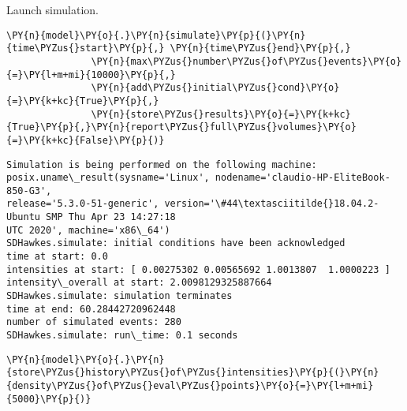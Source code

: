 \documentclass[10pt, article,table]{article}
\begin{document}
Launch simulation.
\begin{tcolorbox}[breakable, size=fbox, boxrule=1pt, pad at break*=1mm,colback=cellbackground, colframe=cellborder]
\begin{Verbatim}[commandchars=\\\{\}]
\PY{n}{model}\PY{o}{.}\PY{n}{simulate}\PY{p}{(}\PY{n}{time\PYZus{}start}\PY{p}{,} \PY{n}{time\PYZus{}end}\PY{p}{,}
               \PY{n}{max\PYZus{}number\PYZus{}of\PYZus{}events}\PY{o}{=}\PY{l+m+mi}{10000}\PY{p}{,}
               \PY{n}{add\PYZus{}initial\PYZus{}cond}\PY{o}{=}\PY{k+kc}{True}\PY{p}{,}
               \PY{n}{store\PYZus{}results}\PY{o}{=}\PY{k+kc}{True}\PY{p}{,}\PY{n}{report\PYZus{}full\PYZus{}volumes}\PY{o}{=}\PY{k+kc}{False}\PY{p}{)}
\end{Verbatim}
\end{tcolorbox}
\begin{tcolorbox}[breakable, size=fbox, boxrule=.5pt, pad at break*=1mm, opacityfill=0]
\begin{scriptsize}
\begin{Verbatim}[commandchars=\\\{\}]
Simulation is being performed on the following machine:
posix.uname\_result(sysname='Linux', nodename='claudio-HP-EliteBook-850-G3',
release='5.3.0-51-generic', version='\#44\textasciitilde{}18.04.2-Ubuntu SMP Thu Apr 23 14:27:18
UTC 2020', machine='x86\_64')
SDHawkes.simulate: initial conditions have been acknowledged
time at start: 0.0
intensities at start: [ 0.00275302 0.00565692 1.0013807  1.0000223 ]
intensity\_overall at start: 2.0098129325887664
SDHawkes.simulate: simulation terminates
time at end: 60.28442720962448
number of simulated events: 280
SDHawkes.simulate: run\_time: 0.1 seconds
\end{Verbatim}
\end{scriptsize}
\end{tcolorbox}
\begin{tcolorbox}[breakable, size=fbox, boxrule=1pt, pad at break*=1mm,colback=cellbackground, colframe=cellborder]
\begin{Verbatim}[commandchars=\\\{\}]
\PY{n}{model}\PY{o}{.}\PY{n}{store\PYZus{}history\PYZus{}of\PYZus{}intensities}\PY{p}{(}\PY{n}{density\PYZus{}of\PYZus{}eval\PYZus{}points}\PY{o}{=}\PY{l+m+mi}{5000}\PY{p}{)}
\end{Verbatim}
\end{tcolorbox}
\end{document}
